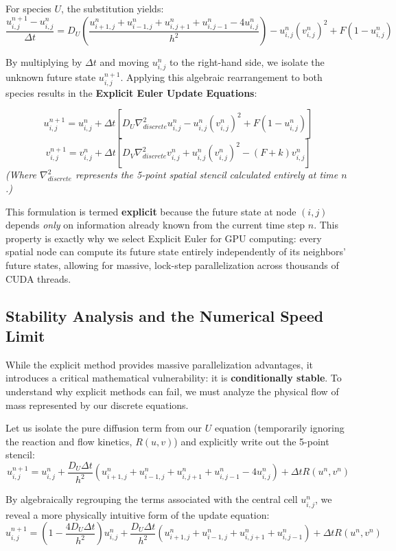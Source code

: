 \documentclass[12pt,a4paper]{article}
\begin{document}
For species $U$, the substitution yields:
$$\frac{u^{n+1}_{i,j} - u^n_{i,j}}{\Delta t} = D_U \left( \frac{u^n_{i+1, j} + u^n_{i-1, j} + u^n_{i, j+1} + u^n_{i, j-1} - 4u^n_{i, j}}{h^2} \right) - u^n_{i,j} (v^n_{i,j})^2 + F(1 - u^n_{i,j})$$

By multiplying by $\Delta t$ and moving $u^n_{i,j}$ to the right-hand side, we isolate the unknown future state $u^{n+1}_{i,j}$. Applying this algebraic rearrangement to both species results in the \textbf{Explicit Euler Update Equations}:

$$u^{n+1}_{i,j} = u^n_{i,j} + \Delta t \left[ D_U \nabla^2_{discrete} u^n_{i,j} - u^n_{i,j} (v^n_{i,j})^2 + F(1 - u^n_{i,j}) \right]$$
$$v^{n+1}_{i,j} = v^n_{i,j} + \Delta t \left[ D_V \nabla^2_{discrete} v^n_{i,j} + u^n_{i,j} (v^n_{i,j})^2 - (F + k)v^n_{i,j} \right]$$
\textit{(Where $\nabla^2_{discrete}$ represents the 5-point spatial stencil calculated entirely at time $n$.)}

This formulation is termed \textbf{explicit} because the future state at node $(i,j)$ depends \textit{only} on information already known from the current time step $n$. This property is exactly why we select Explicit Euler for GPU computing: every spatial node can compute its future state entirely independently of its neighbors' future states, allowing for massive, lock-step parallelization across thousands of CUDA threads.

\subsection{Stability Analysis and the Numerical Speed Limit}
While the explicit method provides massive parallelization advantages, it introduces a critical mathematical vulnerability: it is \textbf{conditionally stable}. To understand why explicit methods can fail, we must analyze the physical flow of mass represented by our discrete equations. 

Let us isolate the pure diffusion term from our $U$ equation (temporarily ignoring the reaction and flow kinetics, $R(u,v)$) and explicitly write out the 5-point stencil:
$$u^{n+1}_{i,j} = u^n_{i,j} + \frac{D_U \Delta t}{h^2} \left( u^n_{i+1, j} + u^n_{i-1, j} + u^n_{i, j+1} + u^n_{i, j-1} - 4u^n_{i, j} \right) + \Delta t R(u^n, v^n)$$

By algebraically regrouping the terms associated with the central cell $u^n_{i,j}$, we reveal a more physically intuitive form of the update equation:
$$u^{n+1}_{i,j} = \left( 1 - \frac{4D_U \Delta t}{h^2} \right) u^n_{i,j} + \frac{D_U \Delta t}{h^2} \left( u^n_{i+1, j} + u^n_{i-1, j} + u^n_{i, j+1} + u^n_{i, j-1} \right) + \Delta t R(u^n, v^n)$$
\end{document}
